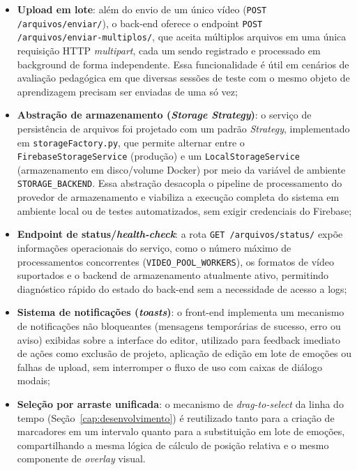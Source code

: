 \documentclass[
	12pt,
	openright,
	oneside,
	a4paper,
	english,
	brazil
	]{abntex2}
\begin{document}
\begin{itemize}
    \item \textbf{Upload em lote}: além do envio de um único vídeo (\texttt{POST /arquivos/enviar/}), o back-end oferece o endpoint \texttt{POST /arquivos/enviar-multiplos/}, que aceita múltiplos arquivos em uma única requisição HTTP \textit{multipart}, cada um sendo registrado e processado em background de forma independente. Essa funcionalidade é útil em cenários de avaliação pedagógica em que diversas sessões de teste com o mesmo objeto de aprendizagem precisam ser enviadas de uma só vez;

    \item \textbf{Abstração de armazenamento (\textit{Storage Strategy})}: o serviço de persistência de arquivos foi projetado com um padrão \textit{Strategy}, implementado em \texttt{storageFactory.py}, que permite alternar entre o \texttt{FirebaseStorageService} (produção) e um \texttt{LocalStorageService} (armazenamento em disco/volume Docker) por meio da variável de ambiente \texttt{STORAGE\_BACKEND}. Essa abstração desacopla o pipeline de processamento do provedor de armazenamento e viabiliza a execução completa do sistema em ambiente local ou de testes automatizados, sem exigir credenciais do Firebase;

    \item \textbf{Endpoint de status/\textit{health-check}}: a rota \texttt{GET /arquivos/status/} expõe informações operacionais do serviço, como o número máximo de processamentos concorrentes (\texttt{VIDEO\_POOL\_WORKERS}), os formatos de vídeo suportados e o backend de armazenamento atualmente ativo, permitindo diagnóstico rápido do estado do back-end sem a necessidade de acesso a logs;

    \item \textbf{Sistema de notificações (\textit{toasts})}: o front-end implementa um mecanismo de notificações não bloqueantes (mensagens temporárias de sucesso, erro ou aviso) exibidas sobre a interface do editor, utilizado para feedback imediato de ações como exclusão de projeto, aplicação de edição em lote de emoções ou falhas de upload, sem interromper o fluxo de uso com caixas de diálogo modais;

    \item \textbf{Seleção por arraste unificada}: o mecanismo de \textit{drag-to-select} da linha do tempo (Seção~\ref{cap:desenvolvimento}) é reutilizado tanto para a criação de marcadores em um intervalo quanto para a substituição em lote de emoções, compartilhando a mesma lógica de cálculo de posição relativa e o mesmo componente de \textit{overlay} visual.
\end{itemize}
\end{document}
